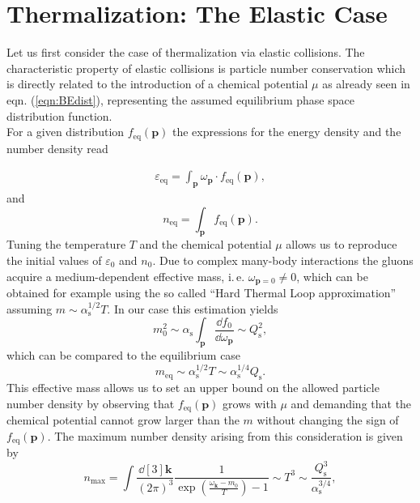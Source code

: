 \section{Thermalization: The Elastic Case}
Let us first consider the case of thermalization via  elastic collisions. The characteristic property of elastic collisions is particle number conservation which is directly related to the introduction of a chemical potential $\mu$ as already seen in eqn. (\ref{eqn:BEdist}), representing the assumed equilibrium phase space distribution function.\\
\noindent
For a given distribution $f_{\mathrm{eq}}(\mathbf{p})$ the expressions for the energy density and the number density read

\begin{align}
	\varepsilon_{\mathrm{eq}} =\int_{\mathbf{p}} \omega_{\mathbf{p}}\cdot f_{\mathrm{eq}}(\mathbf{p}),
\end{align}
and
\begin{equation}
		n_{\mathrm{eq}} = \int_{\mathbf{p}} 	f_{\mathrm{eq}}(\mathbf{p}).
\end{equation}
Tuning the temperature $T$ and the chemical potential $\mu$ allows us to reproduce the initial values of $\varepsilon_0$ and $n_0$. \newpage
\noindent
Due to complex many-body interactions the gluons acquire a medium-dependent effective mass, i.\,e. $\omega_{\mathbf{p}=0}\neq 0$, which can be obtained for example using the so called \enquote{Hard Thermal Loop approximation} assuming $m\sim \alpha_{\mathrm{s}}^{1/2}T$. In our case this estimation yields
\begin{equation}
	m_0^2 \sim \alpha_{\mathrm{s}}\int_{\mathbf{p}}\frac{\dd f_0}{\dd\omega_{\mathbf{p}}} \sim Q_{\mathrm{s}}^2,
\end{equation}\label{eqn:bose-einstein}
which can be compared to the equilibrium case 
\begin{equation}
	m_{\mathrm{eq}}\sim \alpha_{\mathrm{s}}^{1/2}T \sim \alpha_{\mathrm{s}}^{1/4}Q_{\mathrm{s}}.
\end{equation}
This effective mass allows us to set an upper bound on the allowed particle number density by observing that $f_{\mathrm{eq}}(\mathbf{p})$ grows with $\mu$ and demanding that the chemical potential cannot grow larger than the $m$ without changing the sign of $f_{\mathrm{eq}}(\mathbf{p})$. The maximum number density arising from this consideration is given by  
\begin{equation}
	n_{\mathrm{max}} = \int\frac{\dd[3]\mathbf{k}}{(2\pi)^3}\frac{1}{\exp\left(\frac{\omega_{\mathbf{k}}-m_0}{T}\right)-1}\sim T^{3}\sim \frac{Q_{\mathrm{s}}^3}{\alpha_{\mathrm{s}}^{3/4}},
\end{equation}
